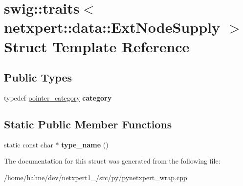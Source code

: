 \hypertarget{structswig_1_1traits_3_01netxpert_1_1data_1_1ExtNodeSupply_01_4}{}\section{swig\+:\+:traits$<$ netxpert\+:\+:data\+:\+:Ext\+Node\+Supply $>$ Struct Template Reference}
\label{structswig_1_1traits_3_01netxpert_1_1data_1_1ExtNodeSupply_01_4}
\subsection*{Public Types}
\begin{DoxyCompactItemize}
\item 
typedef \hyperlink{structswig_1_1pointer__category}{pointer\+\_\+category} {\bfseries category}\hypertarget{structswig_1_1traits_3_01netxpert_1_1data_1_1ExtNodeSupply_01_4_aad24af8b9b8c9c619e0ebcb4f2d39e18}{}\label{structswig_1_1traits_3_01netxpert_1_1data_1_1ExtNodeSupply_01_4_aad24af8b9b8c9c619e0ebcb4f2d39e18}

\end{DoxyCompactItemize}
\subsection*{Static Public Member Functions}
\begin{DoxyCompactItemize}
\item 
static const char $\ast$ {\bfseries type\+\_\+name} ()\hypertarget{structswig_1_1traits_3_01netxpert_1_1data_1_1ExtNodeSupply_01_4_a2033a31adcc24fd535a3850c9bb5e8c2}{}\label{structswig_1_1traits_3_01netxpert_1_1data_1_1ExtNodeSupply_01_4_a2033a31adcc24fd535a3850c9bb5e8c2}

\end{DoxyCompactItemize}


The documentation for this struct was generated from the following file\+:\begin{DoxyCompactItemize}
\item 
/home/hahne/dev/netxpert1\+\_/src/py/pynetxpert\+\_\+wrap.\+cpp\end{DoxyCompactItemize}
